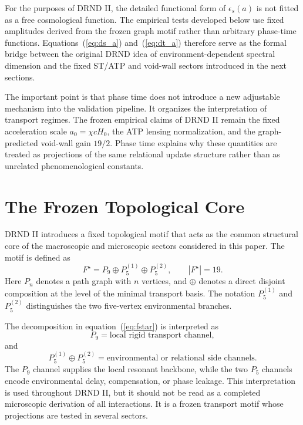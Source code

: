 \documentclass[12pt]{iopart}
\begin{document}
For the purposes of DRND II, the detailed functional form of \(\epsilon_s(a)\) is not fitted as a free cosmological function. The empirical tests developed below use fixed amplitudes derived from the frozen graph motif rather than arbitrary phase-time functions. Equations~(\ref{eq:ds_a}) and~(\ref{eq:dt_a}) therefore serve as the formal bridge between the original DRND idea of environment-dependent spectral dimension and the fixed ST/ATP and void-wall sectors introduced in the next sections.

The important point is that phase time does not introduce a new adjustable mechanism into the validation pipeline. It organizes the interpretation of transport regimes. The frozen empirical claims of DRND II remain the fixed acceleration scale \(a_0=\chi cH_0\), the ATP lensing normalization, and the graph-predicted void-wall gain \(19/2\). Phase time explains why these quantities are treated as projections of the same relational update structure rather than as unrelated phenomenological constants.

\section{The Frozen Topological Core}
\label{sec:frozen_core}

DRND II introduces a fixed topological motif that acts as the common structural core of the macroscopic and microscopic sectors considered in this paper. The motif is defined as
\begin{equation}
F^\star
=
P_9\oplus P_5^{(1)}\oplus P_5^{(2)},
\qquad
|F^\star|=19.
\label{eq:fstar}
\end{equation}
Here \(P_n\) denotes a path graph with \(n\) vertices, and \(\oplus\) denotes a direct disjoint composition at the level of the minimal transport basis. The notation \(P_5^{(1)}\) and \(P_5^{(2)}\) distinguishes the two five-vertex environmental branches.

The decomposition in equation~(\ref{eq:fstar}) is interpreted as
\begin{equation}
P_9
=
\textrm{local rigid transport channel},
\end{equation}
and
\begin{equation}
P_5^{(1)}\oplus P_5^{(2)}
=
\textrm{environmental or relational side channels}.
\end{equation}
The \(P_9\) channel supplies the local resonant backbone, while the two \(P_5\) channels encode environmental delay, compensation, or phase leakage. This interpretation is used throughout DRND II, but it should not be read as a completed microscopic derivation of all interactions. It is a frozen transport motif whose projections are tested in several sectors.
\end{document}
